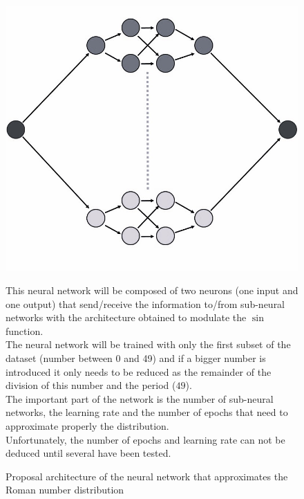 \documentclass[a4paper, 11pt]{article}
\begin{document}
\begin{figure}[h]
    \begin{minipage}{5.5cm}
        \begin{center}
            \includegraphics[width = 1\linewidth]{Neural_Network/roman_architecture.jpg}
            \caption{Proposal architecture of the neural network that approximates the Roman number distribution}
            \label{roman-architecture}
        \end{center}
    \end{minipage}
    \hspace{1em}
    \begin{minipage}{9cm}
 This neural network will be composed of two neurons (one input and one output) that send/receive the information to/from sub-neural networks with the architecture obtained to modulate the $\sin$ function.\\
 The neural network will be trained with only the first subset of the dataset (number between 0 and 49) and if a bigger number is introduced it only needs to be reduced as the remainder of the division of this number and the period ($49$).\\
 The important part of the network is the number of sub-neural networks, the learning rate and the number of epochs that need to approximate properly the distribution.\\
 Unfortunately, the number of epochs and learning rate can not be deduced until several have been tested.
    \end{minipage}
\end{figure}\\
\end{document}
